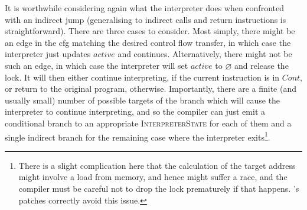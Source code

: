 It is worthwhile considering again what the interpreter does when
confronted with an indirect jump (generalising to indirect calls and
return instructions is straightforward).  There are three cases to
consider.  Most simply, there might be an edge in the \gls{cfg}
matching the desired control flow transfer, in which case the
interpreter just updates $\mathit{active}$ and continues.
Alternatively, there might not be such an edge, in which case the
interpreter will set $\mathit{active}$ to $\varnothing$ and release
the lock.  It will then either continue interpreting, if the current
instruction is in $\mathit{Cont}$, or return to the original program,
otherwise.  Importantly, there are a finite (and usually small) number
of possible targets of the branch which will cause the interpreter to
continue interpreting, and so the compiler can just emit a conditional
branch to an appropriate \textsc{InterpreterState} for each of them
and a single indirect branch for the remaining case where the
interpreter exits\footnote{There is a slight complication here that
  the calculation of the target address might involve a load from
  memory, and hence might suffer a race, and the compiler must be
  careful not to drop the lock prematurely if that happens.
  {\Implementation}'s patches correctly avoid this issue.}.

